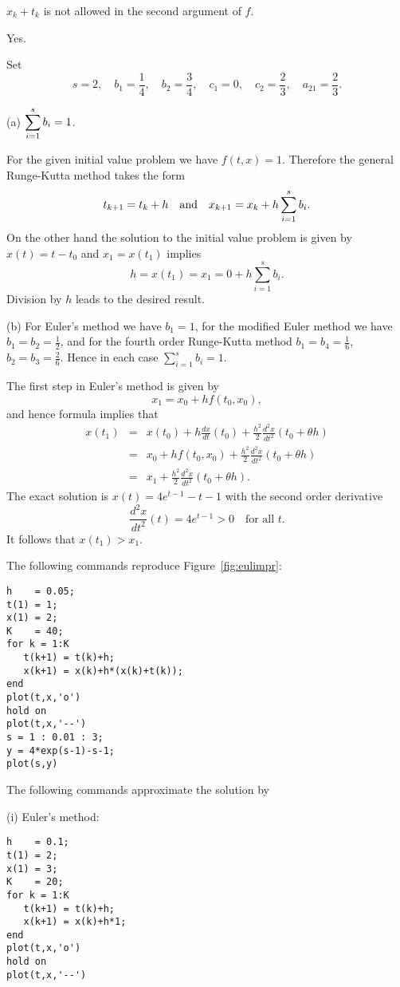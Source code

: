 \documentclass{ximera}
\begin{document}
\soln $x_k+t_k$ is not allowed in the second argument of $f$.

 \ans Yes.

\soln Set
\[
s=2,\quad b_1=\frac{1}{4},\quad b_2=\frac{3}{4},\quad
c_1=0,\quad c_2=\frac{2}{3},\quad a_{21}=\frac{2}{3}.
\]

(a) \ans $\displaystyle\sum_{i=1}^s b_i = 1$.

\soln For the given initial value problem we have $f(t,x)=1$.
Therefore the general Runge-Kutta method takes the form
\[
t_{k+1} = t_k + h\quad\mbox{and}\quad x_{k+1} = x_k + h\sum_{i=1}^s b_i.
\]
On the other hand the solution to the initial value problem is
given by $x(t) = t-t_0$ and $x_1=x(t_1)$ implies
\[
h = x(t_1) = x_1 = 0+h\sum_{i=1}^s b_i.
\]
Division by $h$ leads to the desired result.

(b) For Euler's method we have $b_1=1$, for the modified Euler
method we have $b_1=b_2=\frac{1}{2}$, and for the fourth order
Runge-Kutta method $b_1=b_4 = \frac{1}{6}$,
$b_2 = b_3 = \frac{2}{6}$.  Hence in each case $\sum_{i=1}^s b_i=1$.

 The first step in Euler's method is given by
\[
x_1 = x_0 + hf(t_0,x_0),
\]
and hence formula  implies that
\begin{eqnarray*}
x(t_1) &=&  x(t_0)+h\frac{dx}{dt}(t_0)+
\frac{h^2}{2}\frac{d^2x}{dt^2}(t_0+\theta h)\\
&=& x_0 + hf(t_0,x_0) +\frac{h^2}{2}\frac{d^2x}{dt^2}(t_0+\theta h)\\
&=& x_1 +\frac{h^2}{2}\frac{d^2x}{dt^2}(t_0+\theta h).
\end{eqnarray*}
The exact solution is $x(t)= 4e^{t-1}-t-1$ with the second order
derivative
\[
\frac{d^2x}{dt^2}(t) = 4e^{t-1}>0\quad \mbox{for all $t$.}
\]
It follows that $x(t_1) > x_1$.

 The following \Matlab commands reproduce
Figure~\ref{fig:eulimpr}:
\begin{verbatim}
h    = 0.05;
t(1) = 1;
x(1) = 2;
K    = 40;
for k = 1:K
   t(k+1) = t(k)+h;
   x(k+1) = x(k)+h*(x(k)+t(k));
end
plot(t,x,'o')
hold on
plot(t,x,'--')
s = 1 : 0.01 : 3;
y = 4*exp(s-1)-s-1;
plot(s,y)
\end{verbatim}

 The following \Matlab commands approximate the
solution by

(i) Euler's method:
\begin{verbatim}
h    = 0.1;
t(1) = 2;
x(1) = 3;
K    = 20;
for k = 1:K
   t(k+1) = t(k)+h;
   x(k+1) = x(k)+h*1;
end
plot(t,x,'o')
hold on
plot(t,x,'--')
\end{verbatim}
\end{document}
